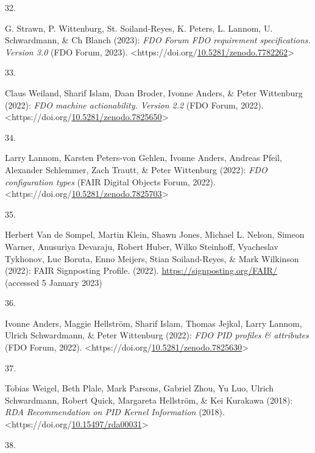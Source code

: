\begin{thebibliography}{9}
\hypertarget{ref-fdo-RequirementSpec}{}
32.

G. Strawn, P. Wittenburg, St. Soiland-Reyes, K. Peters, L. Lannom, U.
Schwardmann, \& Ch Blanch (2023): \emph{{FDO Forum FDO} requirement
specifications. Version 3.0} ({FDO Forum}, 2023).
\textless https://doi.org/\href{https://doi.org/10.5281/zenodo.7782262}{10.5281/zenodo.7782262}\textgreater{}

\hypertarget{ref-fdo-MachineActionDef}{}
33.

Claus Weiland, Sharif Islam, Daan Broder, Ivonne Anders, \& Peter
Wittenburg (2022): \emph{{FDO} machine actionability. Version 2.2} ({FDO
Forum}, 2022).
\textless https://doi.org/\href{https://doi.org/10.5281/zenodo.7825650}{10.5281/zenodo.7825650}\textgreater{}

\hypertarget{ref-fdo-ConfigurationTypes}{}
34.

Larry Lannom, Karsten Peters-von Gehlen, Ivonne Anders, Andreas Pfeil,
Alexander Schlemmer, Zach Trautt, \& Peter Wittenburg (2022):
\emph{{FDO} configuration types} ({FAIR Digital Objects Forum}, 2022).
\textless https://doi.org/\href{https://doi.org/10.5281/zenodo.7825703}{10.5281/zenodo.7825703}\textgreater{}

\hypertarget{ref-vandesompelFAIRSignpostingProfile2022}{}
35.

Herbert Van de Sompel, Martin Klein, Shawn Jones, Michael L. Nelson,
Simeon Warner, Anusuriya Devaraju, Robert Huber, Wilko Steinhoff,
Vyacheslav Tykhonov, Luc Boruta, Enno Meijers, Stian Soiland-Reyes, \&
Mark Wilkinson (2022): {FAIR Signposting Profile}. (2022).
\url{https://signposting.org/FAIR/} (accessed 5 January 2023)

\hypertarget{ref-fdo-PIDProfileAttributes}{}
36.

Ivonne Anders, Maggie Hellström, Sharif Islam, Thomas Jejkal, Larry
Lannom, Ulrich Schwardmann, \& Peter Wittenburg (2022): \emph{{FDO PID}
profiles \& attributes} ({FDO Forum}, 2022).
\textless https://doi.org/\href{https://doi.org/10.5281/zenodo.7825630}{10.5281/zenodo.7825630}\textgreater{}

\hypertarget{ref-weigelRDARecommendationPID2018}{}
37.

Tobias Weigel, Beth Plale, Mark Parsons, Gabriel Zhou, Yu Luo, Ulrich
Schwardmann, Robert Quick, Margareta Hellström, \& Kei Kurakawa (2018):
\emph{{RDA Recommendation} on {PID Kernel Information}} (2018).
\textless https://doi.org/\href{https://doi.org/10.15497/rda00031}{10.15497/rda00031}\textgreater{}

\hypertarget{ref-islam_2023}{}
38.


\end{thebibliography}
